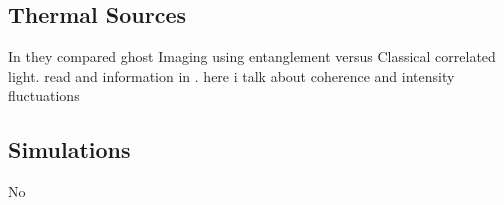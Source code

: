 \subsection{Thermal Sources}

In \cite{thermal} they compared ghost Imaging using entanglement versus Classical correlated light. read and information in \cite{thermalAlejandra}. here i talk about coherence and intensity fluctuations \cite{intensity}

\subsection{Simulations}

No\cite{simulated}



